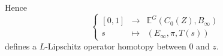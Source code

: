 \begin{dem}
Hence
\[\left\{\begin{array}{rcl} [0,1] & \rightarrow & \mathbb E^G(C_0(Z),B_\infty)\\ s & \mapsto & (E_\infty, \pi,T(s))\end{array}\right.\]
defines a $L$-Lipschitz operator homotopy between $0$ and $z$.\\




\end{dem}
